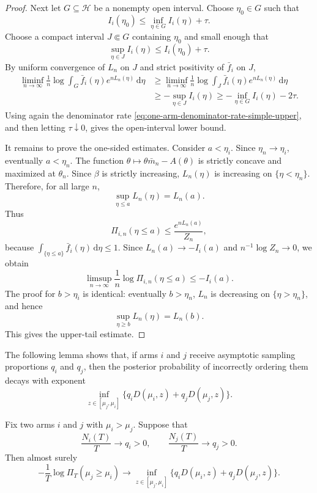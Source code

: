 \documentclass[10pt]{article}
\newcommand{\dd}{\mathrm{d}}
\theoremstyle{plain}
\begin{document}
\begin{proof}
Next let \(G\subseteq\mathcal H\) be a nonempty open interval.  Choose
\(\eta_0\in G\) such that
\[
    I_i(\eta_0)\le \inf_{\eta\in G}I_i(\eta)+\tau.
\]
Choose a compact interval \(J\Subset G\) containing \(\eta_0\) and small enough
that
\[
    \sup_{\eta\in J}I_i(\eta)\le I_i(\eta_0)+\tau.
\]
By uniform convergence of \(L_n\) on \(J\) and strict positivity of
\(\bar f_i\) on \(J\),
\[
\begin{aligned}
    \liminf_{n\to\infty}
    \frac1n\log
    \int_G \bar f_i(\eta)e^{nL_n(\eta)}\,\dd\eta
    &\ge
    \liminf_{n\to\infty}
    \frac1n\log
    \int_J \bar f_i(\eta)e^{nL_n(\eta)}\,\dd\eta                  \\
    &\ge
    -\sup_{\eta\in J}I_i(\eta)
    \ge
    -\inf_{\eta\in G}I_i(\eta)-2\tau.
\end{aligned}
\]
Using again the denominator rate
\eqref{eq:one-arm-denominator-rate-simple-upper}, and then letting
\(\tau\downarrow0\), gives the open-interval lower bound.

It remains to prove the one-sided estimates.  Consider \(a<\eta_i\).  Since
\(\eta_n\to \eta_i\), eventually \(a<\eta_n\).  The function $\theta\mapsto \theta\bar m_n-A(\theta)$
is strictly concave and maximized at \(\theta_n\).  Since \(\beta\) is strictly
increasing, \(L_n(\eta)\) is increasing on \(\{\eta<\eta_n\}\).  Therefore, for all large
\(n\),
\[
    \sup_{\eta\le a}L_n(\eta)=L_n(a).
\]
Thus
\[
    \varPi_{i,n}(\eta\le a)
    \le
    \frac{e^{nL_n(a)}}{Z_n},
\]
because \(\int_{\{\eta\le a\}}\bar f_i(\eta)\,\dd\eta\le1\).
Since $L_n(a)\to -I_i(a)$
and \(n^{-1}\log Z_n\to0\), we obtain
\[
    \limsup_{n\to\infty}
    \frac1n\log\varPi_{i,n}(\eta\le a)
    \le
    -I_i(a).
\]
The proof for \(b>\eta_i\) is identical: eventually \(b>\eta_n\), \(L_n\) is
decreasing on \(\{\eta>\eta_n\}\), and hence
\[
    \sup_{\eta\ge b}L_n(\eta)=L_n(b).
\]
This gives the upper-tail estimate.

\end{proof}

The following lemma shows that, if arms \(i\) and \(j\)
receive asymptotic sampling proportions \(q_i\) and \(q_j\), then the posterior
probability of incorrectly ordering them decays with exponent
\[
    \inf_{z\in[\mu_j,\mu_i]}
    \{q_iD(\mu_i,z)+q_jD(\mu_j,z)\}.
\]

\begin{lemma}
\label{lem:posterior-ordering-simple-upper}
Fix two arms \(i\) and \(j\) with \(\mu_i>\mu_j\).  Suppose that
\[
    \frac{N_i(T)}{T}\to q_i>0,
    \qquad
    \frac{N_j(T)}{T}\to q_j>0.
\]
Then almost surely
\begin{equation} \label{eq:behavior_of_Pi}
    -\frac1T
    \log
    \varPi_T(\mu_j\ge \mu_i)
    \to
    \inf_{z\in[\mu_j,\mu_i]}
    \{q_iD(\mu_i,z)+q_jD(\mu_j,z)\}.
\end{equation}
\end{lemma}
\end{document}
